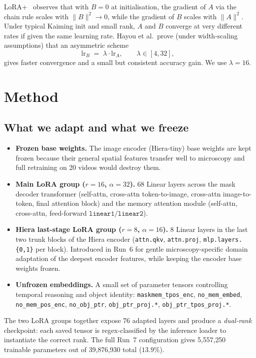 \documentclass[11pt,a4paper]{article}
\begin{document}
LoRA+~\cite{loraplus} observes that with $B=0$ at initialisation, the
gradient of $A$ via the chain rule scales with $\|B\|^2\!\to 0$, while the
gradient of $B$ scales with $\|A\|^2$. Under typical Kaiming init and
small rank, $A$ and $B$ converge at very different rates if given the
same learning rate. Hayou et al.\ prove (under width-scaling assumptions)
that an asymmetric scheme
\begin{equation}
    \mathrm{lr}_B \;=\; \lambda \cdot \mathrm{lr}_A,
    \qquad \lambda \in [4, 32],
\end{equation}
gives faster convergence and a small but consistent accuracy gain. We use
$\lambda=16$.

\section{Method}

\subsection{What we adapt and what we freeze}
\label{sec:freeze}

\begin{itemize}[noitemsep,topsep=3pt]
    \item \textbf{Frozen base weights.} The image encoder (Hiera-tiny)
          base weights are kept frozen because their general spatial
          features transfer well to microscopy and full retraining on
          20 videos would destroy them.
    \item \textbf{Main LoRA group ($r{=}16$, $\alpha{=}32$).} 68 Linear
          layers across the mask decoder transformer (self-attn,
          cross-attn token-to-image, cross-attn image-to-token, final
          attention block) and the memory attention module (self-attn,
          cross-attn, feed-forward
          $\mathtt{linear1}/\mathtt{linear2}$).
    \item \textbf{Hiera last-stage LoRA group ($r{=}8$, $\alpha{=}16$).}
          8 Linear layers in the last two trunk blocks of the Hiera
          encoder (\texttt{attn.qkv}, \texttt{attn.proj},
          \texttt{mlp.layers.\{0,1\}} per block). Introduced in Run~6
          for gentle microscopy-specific domain adaptation of the
          deepest encoder features, while keeping the encoder base
          weights frozen.
    \item \textbf{Unfrozen embeddings.} A small set of parameter tensors
          controlling temporal reasoning and object identity:
          \texttt{maskmem\_tpos\_enc}, \texttt{no\_mem\_embed},
          \texttt{no\_mem\_pos\_enc}, \texttt{no\_obj\_ptr},
          \texttt{obj\_ptr\_proj.*}, \texttt{obj\_ptr\_tpos\_proj.*}.
\end{itemize}
The two LoRA groups together expose 76 adapted layers and produce a
\emph{dual-rank} checkpoint: each saved tensor is regex-classified by
the inference loader to instantiate the correct rank. The full Run~7
configuration gives 5{,}557{,}250 trainable parameters out of
39{,}876{,}930 total ($13.9\%$).
\end{document}
